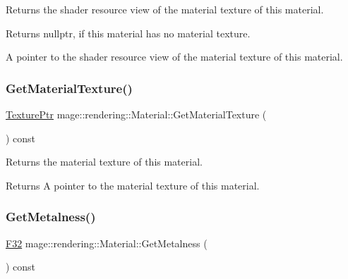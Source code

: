 Returns the shader resource view of the material texture of this material.

\begin{DoxyReturn}{Returns}
{\ttfamily nullptr}, if this material has no material texture. 

A pointer to the shader resource view of the material texture of this material. 
\end{DoxyReturn}
\mbox{\label{classmage_1_1rendering_1_1_material_aa396990a630c749a46a8a9fc88e80683}} 
\subsubsection{\texorpdfstring{Get\+Material\+Texture()}{GetMaterialTexture()}}
{\footnotesize\ttfamily \mbox{\hyperlink{namespacemage_1_1rendering_a6f3ae54f825328465b0cdde0f0de4a36}{Texture\+Ptr}} mage\+::rendering\+::\+Material\+::\+Get\+Material\+Texture (\begin{DoxyParamCaption}{ }\end{DoxyParamCaption}) const\hspace{0.3cm}{\ttfamily [noexcept]}}

Returns the material texture of this material.

\begin{DoxyReturn}{Returns}
A pointer to the material texture of this material. 
\end{DoxyReturn}
\mbox{\label{classmage_1_1rendering_1_1_material_aaa4265533437b462e2f2087cfa37e623}} 
\subsubsection{\texorpdfstring{Get\+Metalness()}{GetMetalness()}}
{\footnotesize\ttfamily \mbox{\hyperlink{namespacemage_aa97e833b45f06d60a0a9c4fc22ae02c0}{F32}} mage\+::rendering\+::\+Material\+::\+Get\+Metalness (\begin{DoxyParamCaption}{ }\end{DoxyParamCaption}) const\hspace{0.3cm}{\ttfamily [noexcept]}}

